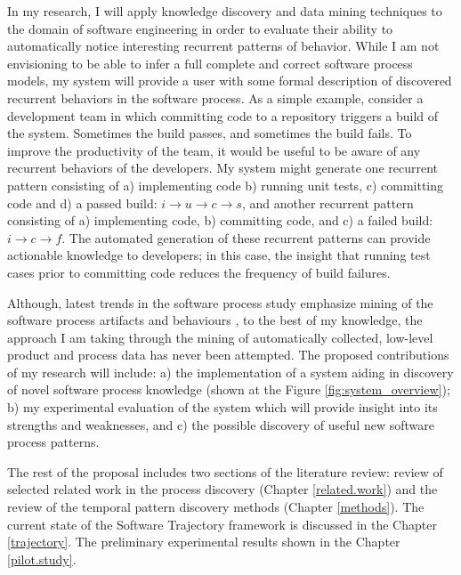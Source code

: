 In my research, I will apply knowledge discovery and data mining techniques to the domain of software engineering in order to evaluate their ability to automatically notice interesting recurrent patterns of behavior. While I am not envisioning to be able to infer a full complete and correct software process models, my system will provide a user with some formal description of discovered recurrent behaviors in the software process. As a simple example, consider a development team in which committing code to a repository triggers a build of the system. Sometimes the build passes, and sometimes the build fails. To improve the productivity of the team, it would be useful to be aware of any recurrent behaviors of the developers. My system might generate one recurrent pattern consisting of a) implementing code b) running unit tests, c) committing code and d) a passed build: $i \rightarrow u \rightarrow c \rightarrow s $, and another recurrent pattern consisting of a) implementing code, b) committing code, and c) a failed build: $i \rightarrow c \rightarrow f $. The automated generation of these recurrent patterns can provide actionable knowledge to developers; in this case, the insight that running test cases prior to committing code reduces the frequency of build failures.

Although, latest trends in the software process study emphasize mining of the software process artifacts and behaviours \cite{citeulike:5043664} \cite{citeulike:1885717} \cite{citeulike:5112229} \cite{citeulike:1885717}, to the best of my knowledge, the approach I am taking through the mining of 
automatically collected, low-level product and process data has never been attempted. The proposed contributions of my research will include: a) the implementation of a system aiding in discovery of novel software process knowledge (shown at the Figure \ref{fig:system_overview}); b) my experimental evaluation of the system which will provide insight into its strengths and weaknesses, and c) the possible discovery of useful new software process patterns.

The rest of the proposal includes two sections of the literature review: review of selected related work in the process discovery (Chapter \ref{related.work}) and the review of the temporal pattern discovery methods (Chapter \ref{methods}). The current state of the Software Trajectory framework is discussed in the Chapter \ref{trajectory}. The preliminary experimental results shown in the Chapter \ref{pilot.study}. 
